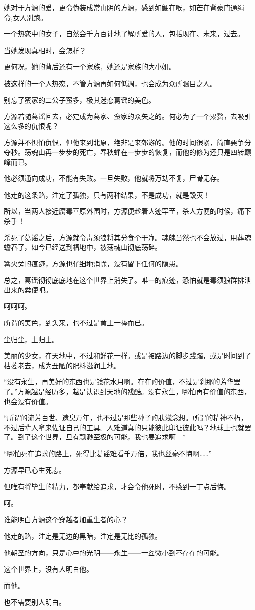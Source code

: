 \begin{this_body}
她对于方源的爱，更令伪装成常山阴的方源，感到如鲠在喉，如芒在背豪门通缉令,女人别跑。

一个热恋中的女子，自然会千方百计地了解所爱的人，包括现在、未来，过去。

当她发现真相时，会怎样？

更何况，她的背后还有一个家族，她还是家族的大小姐。

被这样的一个人热恋，不管方源再如何低调，也会成为众所瞩目之人。

别忘了蛮家的二公子蛮多，极其迷恋葛谣的美色。

方源若随葛谣回去，必定成为葛家、蛮家的众矢之的。何必为了一个累赘，去吸引这么多的仇恨呢？

方源并不惧怕仇恨，但他来到北原，绝非是来郊游的。他的时间很紧，简直要争分夺秒。荡魂山再一步步的死亡，春秋蝉在一步步的恢复，而他的修为还只是四转巅峰而已。

他必须通向成功，不能有失败。一旦失败，他就将万劫不复，尸骨无存。

他走的这条路，注定了孤独，只有两种结果，不是成功，就是毁灭！

所以，当两人接近腐毒草原外围时，方源便趁着人迹罕至，杀人方便的时候，痛下杀手！

杀死了葛谣之后，方源就令毒须狼将其分食个干净。魂魄当然也不会放过，用葬魂蟾吞了，如今已经送到福地中，被荡魂山彻底荡碎。

篝火旁的痕迹，方源也仔细地消除，没有留下任何的隐患。

总之，葛谣彻彻底底地在这个世界上消失了。唯一的痕迹，恐怕就是毒须狼群排泄出来的粪便吧。

呵呵呵。

所谓的美色，到头来，也不过是黄土一捧而已。

尘归尘，土归土。

美丽的少女，在天地中，不过和鲜花一样。或是被路边的脚步践踏，或是时间到了枯萎老去，成为丑陋的肥料滋润土地。

“没有永生，再美好的东西也是镜花水月啊。存在的价值，不过是刹那的芳华罢了。”方源越是经历多，越是认识到天地的残酷。没有永生，哪怕再有价值的东西，也会没有价值。

“所谓的流芳百世、遗臭万年，也不过是那些孙子的肤浅念想。所谓的精神不朽，不过后辈人拿来佐证自己的工具。人难道真的只能彼此印证彼此吗？地球上也就罢了。到了这个世界，旦有飘渺至极的可能，我也要追求啊！”

“哪怕死在追求的路上，死得比葛谣难看千万倍，我也丝毫不悔啊……”

方源早已心生死志。

但唯有将毕生的精力，都奉献给追求，才会令他死时，不感到一丁点后悔。

呵。

谁能明白方源这个穿越者加重生者的心？

他走的路，注定是无边的黑暗，注定是无比的孤独。

他朝圣的方向，只是心中的光明——永生——一丝微小到不存在的可能。

这个世界上，没有人明白他。

而他。

也不需要别人明白。

\end{this_body}

